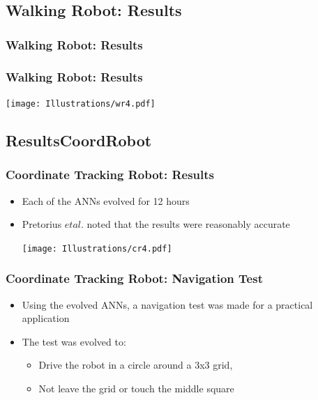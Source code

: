 \documentclass{beamer}
\begin{document}
\subsection{Walking Robot: Results}
\begin{frame}
  \frametitle{Walking Robot: Results}

\end{frame}

\begin{frame}
  \frametitle{Walking Robot: Results}

\begin{center}
 \texttt{[image: Illustrations/wr4.pdf]}
       \\
\end{center}
\end{frame}

\subsection{ResultsCoordRobot}
\begin{frame}
  \frametitle{Coordinate Tracking Robot: Results}
 \begin{itemize}
 \item Each of the ANNs evolved for 12 hours
 \item Pretorius $et al.$ noted that the results were reasonably accurate
\begin{center}
 \texttt{[image: Illustrations/cr4.pdf]}
       \\
\end{center}
\end{itemize}
\end{frame}

\begin{frame}
\frametitle{Coordinate Tracking Robot: Navigation Test}
\begin{itemize}
\item Using the evolved ANNs, a navigation test was made for a practical application
\item The test was evolved to:
\begin{itemize}
\item Drive the robot in a circle around a 3x3 grid,
\item Not leave the grid or touch the middle square
\end{itemize}
\end{itemize}
\end{frame}
\end{document}
